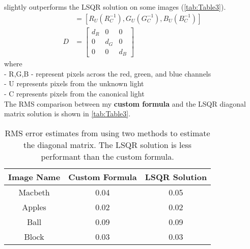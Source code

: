 \documentclass[12pt]{report}
\begin{document}
\begin{enumerate}
    slightly outperforms the LSQR solution on some images (\autoref{tab:Table3}).
    \begin{align*}
    [d_R,d_G,d_B] &= [R_U(R_C^{-1}), G_U(G_C^{-1}), B_U(B_C^{-1})] \\
    D &= 
    \begin{bmatrix}
    d_R & 0 & 0 \\
    0 & d_G & 0 \\
    0 & 0 & d_B
    \end{bmatrix}
    \end{align*}
    where \\
    - R,G,B - represent pixels across the red, green, and blue channels \\
    - U represents pixels from the unknown light \\
    - C represents pixels from the canonical light \\
    The RMS comparison between my \textbf{custom formula} and the LSQR diagonal matrix solution is shown in \autoref{tab:Table3}.

    \begin{table}[h!]
    \begin{center}
    \begin{tabular}{ | c | c | c | } 
        \hline
        Image Name & Custom Formula & LSQR Solution \\ 
        \hline \hline
        Macbeth & 0.04 & 0.05 \\ 
        Apples & 0.02 & 0.02 \\ 
        Ball & 0.09 & 0.09 \\ 
        Block & 0.03 & 0.03 \\ 
        \hline
    \end{tabular}
    \caption{RMS error estimates from using two methods to estimate the diagonal matrix. The LSQR solution is less performant than the custom formula.}
    \label{tab:Table3}
    \end{center}
    \end{table}



\end{enumerate}
\end{document}

